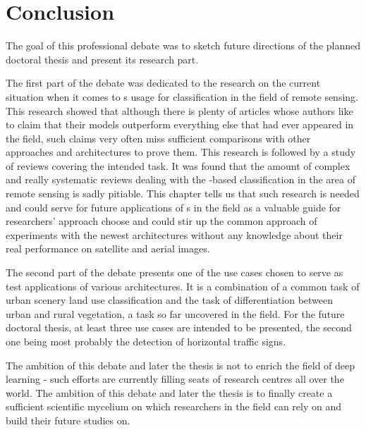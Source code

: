 \chapter{Conclusion}
\label{conclusion}

The goal of this professional debate was to sketch future directions of the planned doctoral thesis and present its research part.

The first part of the debate was dedicated to the research on the current situation when it comes to s usage for classification in the field of remote sensing. This research showed that although there is plenty of articles whose authors like to claim that their models outperform everything else that had ever appeared in the field, such claims very often miss sufficient comparisons with other approaches and architectures to prove them. This research is followed by a study of reviews covering the intended task. It was found that the amount of complex and really systematic reviews dealing with the -based classification in the area of remote sensing is sadly pitiable. This chapter tells us that such research is needed and could serve for future applications of s in the field as a valuable guide for researchers' approach choose and could stir up the common approach of experiments with the newest architectures without any knowledge about their real performance on satellite and aerial images.

The second part of the debate presents one of the use cases chosen to serve as test applications of various  architectures. It is a combination of a common task of urban scenery land use classification and the task of differentiation between urban and rural vegetation, a task so far uncovered in the field. For the future doctoral thesis, at least three use cases are intended to be presented, the second one being most probably the detection of horizontal traffic signs.

The ambition of this debate and later the thesis is not to enrich the field of deep learning - such efforts are currently filling seats of research centres all over the world. The ambition of this debate and later the thesis is to finally create a sufficient scientific mycelium on which researchers in the field can rely on and build their future studies on.